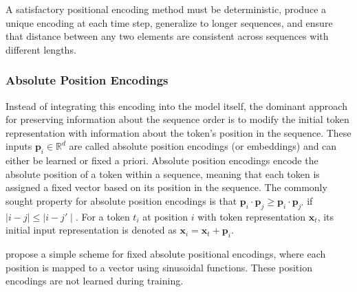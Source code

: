 A satisfactory positional encoding method must be deterministic, produce a unique encoding at each time step, generalize to longer sequences, and ensure that distance between any two elements are consistent across sequences with different lengths.  %


\subsubsection{Absolute Position Encodings}

Instead of integrating this encoding into the model itself, the dominant approach for preserving information about the sequence order is to modify the initial token representation with information about the token's position in the sequence. These inputs $\bm{p}_i \in \mathbb{R}^d$ are called absolute position encodings (or embeddings) and can either be learned or fixed a priori. Absolute position encodings encode the absolute position of a token within a sequence, meaning that each token is assigned a fixed vector based on its position in the sequence. The commonly sought property for absolute position encodings is that $\bm{p}_i \cdot \bm{p}_j \geq \bm{p}_i \cdot \bm{p}_{j'}$ if $\mid i -j \mid \leq \mid i - j'\mid$. For a token $t_i$ at position $i$ with token representation $\bm{x}_t$, its initial input representation is denoted as $\bm{x}_i = \bm{x}_t + \bm{p}_i$.

\citet{vaswani2017attention} propose a simple scheme for fixed absolute positional encodings, where each position is mapped to a vector using sinusoidal functions. These position encodings are not learned during training.



